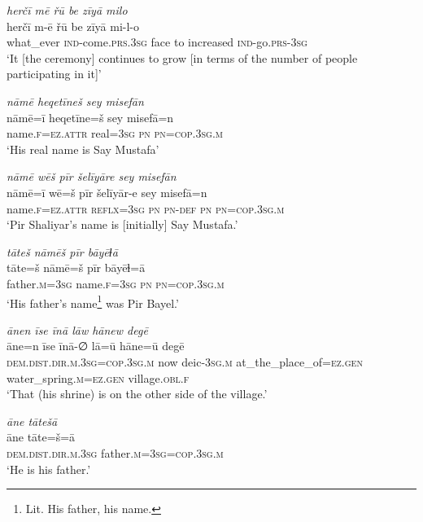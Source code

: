 \ea \label{ZP.131}
\textit{herčī mē řū be zīyā milo} \\ 
\gll herčī m-ē řū be zīyā mi-l-o \\ 
 what\_ever \textsc{ind-}come\textsc{.prs}\textsc{.3sg} face to increased \textsc{ind-}go\textsc{.prs}\textsc{-3sg} \\ 
\glt `It [the ceremony] continues to grow [in terms of the number of people participating in it]'
\z 
 
\ea \label{ŽP.1}
\textit{nāmē heqetīneš sey misefān} \\ 
\gll nāmē=ī heqetīne=š sey misefā=n \\ 
 name\textsc{.f}\textsc{=ez}.\textsc{attr} real\textsc{=3sg} \textsc{pn} \textsc{pn}\textsc{=cop}\textsc{.3sg}\textsc{.m} \\ 
\glt `His real name is Say Mustafa'
\z 
 
\ea \label{ŽP.2}
\textit{nāmē wēš pīr šelīyāre sey misefān} \\ 
\gll nāmē=ī wē=š pīr šelīyār-e sey misefā=n \\ 
 name\textsc{.f}\textsc{=ez}.\textsc{attr} \textsc{reflx}\textsc{=3sg} \textsc{pn} \textsc{pn}\textsc{-def} \textsc{pn} \textsc{pn}\textsc{=cop}\textsc{.3sg}\textsc{.m} \\ 
\glt `Pir Shaliyar’s name is [initially] Say Mustafa.'
\z 
 
\ea \label{ŽP.5}
\textit{tāteš nāmēš pīr bāyēɫā} \\ 
\gll tāte=š nāmē=š pīr bāyēɫ=ā \\ 
 father\textsc{.m}\textsc{=3sg} name\textsc{.f}\textsc{=3sg} \textsc{pn} \textsc{pn}\textsc{=cop}\textsc{.3sg}\textsc{.m} \\ 
\glt `His father’s name\footnote{Lit. His father, his name.} was Pir Bayel.'
\z 
 
\ea \label{ŽP.6}
\textit{ānen īse īnā lāw hānew degē} \\ 
\gll āne=n īse īnā-∅ lā=ū hāne=ū degē \\ 
 \textsc{dem.dist}\textsc{.dir}\textsc{.m}\textsc{.3sg}\textsc{=cop}\textsc{.3sg}\textsc{.m} now deic\textsc{-3sg}\textsc{.m} at\_the\_place\_of\textsc{\textsc{=ez.gen}} water\_spring\textsc{.m}\textsc{\textsc{=ez.gen}} village\textsc{.obl}\textsc{.f} \\ 
\glt `That (his shrine) is on the other side of the village.'
\z 
 
\ea \label{ŽP.7}
\textit{āne tātešā} \\ 
\gll āne tāte=š=ā \\ 
 \textsc{dem.dist}\textsc{.dir}\textsc{.m}\textsc{.3sg} father\textsc{.m}\textsc{=3sg}\textsc{=cop}\textsc{.3sg}\textsc{.m} \\ 
\glt `He is his father.'
\z 
 
